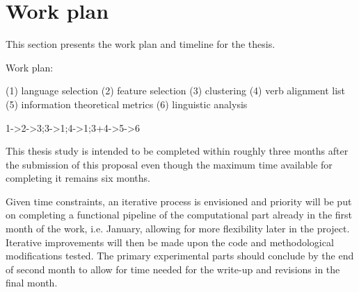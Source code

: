 \section{Work plan}

This section presents the work plan and timeline for the thesis.

Work plan:

(1) language selection
(2) feature selection
(3) clustering 
(4) verb alignment list
(5) information theoretical metrics
(6) linguistic analysis

1->2->3;3->1;4->1;3+4->5->6

This thesis study is intended to be completed within roughly three months after the submission of this proposal even though the maximum time available for completing it remains six months.

Given time constraints, an iterative process is envisioned and priority will be put on completing a functional pipeline of the computational part already in the first month of the work, i.e. January, allowing for more flexibility later in the project. Iterative improvements will then be made upon the code and methodological modifications tested. The primary experimental parts should conclude by the end of second month to allow for time needed for the write-up and revisions in the final month. 